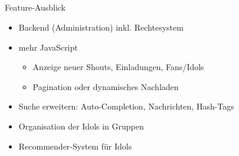 \subsection*{}
\begin{frame}{Feature-Ausblick}
\begin{itemize}
\item Backend (Administration) inkl. Rechtesystem
\item mehr JavaScript
	\begin{itemize}
	\item Anzeige neuer Shouts, Einladungen, Fans/Idols
	\item Pagination oder dynamisches Nachladen
	\end{itemize}
\pause	
\item Suche erweitern: Auto-Completion, Nachrichten, Hash-Tags
\item Organisation der Idols in Gruppen
\item Recommender-System für Idols	
\end{itemize}
\end{frame}

